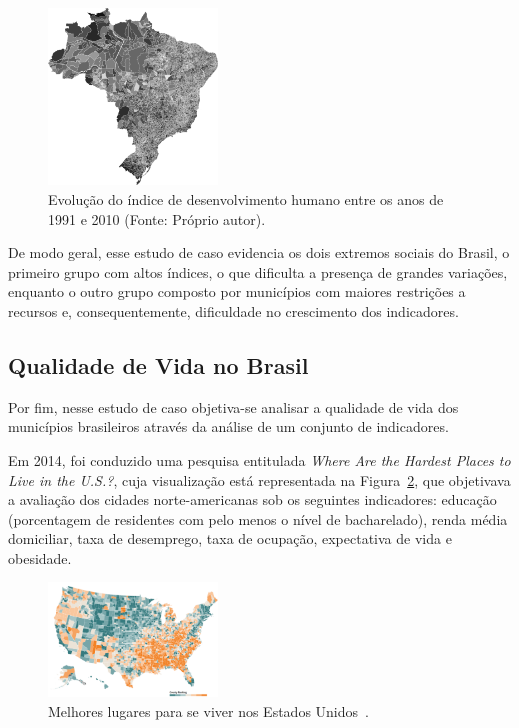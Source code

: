 \documentclass[conference]{IEEEtran}
\begin{document}
\begin{figure}[!ht]
\centering
\includegraphics[width=0.40\textwidth]{evolucao.png}
\caption{Evolução do índice de desenvolvimento humano entre os anos de 1991 e 2010 (Fonte: Próprio autor).}
\label{img:evolucao-idh}
\end{figure}

De modo geral, esse estudo de caso evidencia os dois extremos sociais do Brasil, o primeiro grupo com altos índices, o que dificulta a presença de grandes variações, enquanto o outro grupo composto por municípios com maiores restrições a recursos e, consequentemente, dificuldade no crescimento dos indicadores. 

\subsection{Qualidade de Vida no Brasil}

Por fim, nesse estudo de caso objetiva-se analisar a qualidade de vida dos municípios brasileiros através da análise de um conjunto de indicadores. 

Em 2014, foi conduzido uma pesquisa entitulada \textit{Where Are the Hardest Places to Live in the U.S.?}, cuja visualização está representada na Figura~\ref{img:lugares-viver-usa}, que objetivava a avaliação dos cidades norte-americanas sob os seguintes indicadores: educação (porcentagem de residentes com pelo menos o nível de bacharelado), renda média domiciliar, taxa de desemprego, taxa de ocupação, expectativa de vida e obesidade.

\begin{figure}[!ht]
\centering
\includegraphics[width=0.40\textwidth]{usa.png}
\caption{Melhores lugares para se viver nos Estados Unidos~\cite{nytimes}.}
\label{img:lugares-viver-usa}
\end{figure}
\end{document}
